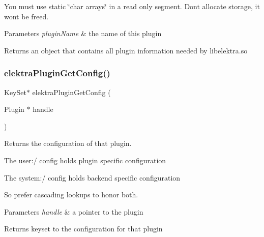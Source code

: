 You must use static \char`\"{}char arrays\char`\"{} in a read only segment. Don\textquotesingle{}t allocate storage, it won\textquotesingle{}t be freed.


\begin{DoxyParams}{Parameters}
{\em plugin\+Name} & the name of this plugin \\
\hline
\end{DoxyParams}
\begin{DoxyReturn}{Returns}
an object that contains all plugin information needed by libelektra.\+so 
\end{DoxyReturn}
\mbox{\label{group__plugin_ga644bead796506c172817724051c977c9}} 
\subsubsection{\texorpdfstring{elektra\+Plugin\+Get\+Config()}{elektraPluginGetConfig()}}
{\footnotesize\ttfamily Key\+Set$\ast$ elektra\+Plugin\+Get\+Config (\begin{DoxyParamCaption}\item[{Plugin $\ast$}]{handle }\end{DoxyParamCaption})}



Returns the configuration of that plugin. 


\begin{DoxyItemize}
\item The user\+:/ config holds plugin specific configuration
\item The system\+:/ config holds backend specific configuration
\end{DoxyItemize}

So prefer cascading lookups to honor both.


\begin{DoxyParams}{Parameters}
{\em handle} & a pointer to the plugin\\
\hline
\end{DoxyParams}
\begin{DoxyReturn}{Returns}
keyset to the configuration for that plugin 
\end{DoxyReturn}
\mbox{\label{group__plugin_gaafcf3216b46292f222b8cc7828b4dd20}} 
